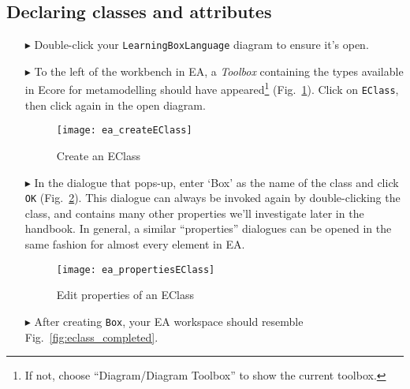 \newpage
\subsection{Declaring classes and attributes}
\visHeader
\hypertarget{static:classes vis}{}

\begin{itemize}

\item[$\blacktriangleright$] Double-click your \texttt{LearningBoxLanguage} diagram to ensure it's open.

\vspace{0.5cm}

\item[$\blacktriangleright$] To the left of the workbench in EA, a \emph{Toolbox} containing the types available in Ecore for metamodelling should have
appeared\footnote{If not, choose ``Diagram/Diagram Toolbox'' to show the current toolbox.} (Fig.~\ref{fig:eclass}). Click on \texttt{EClass}, then click again
in the open diagram.

\vspace{0.5cm}

\begin{figure}[htbp]
	\centering
  \texttt{[image: ea\_createEClass]}
	\caption{Create an EClass}
	\label{fig:eclass}
\end{figure}

\vspace{0.5cm}

\item[$\blacktriangleright$] In the dialogue that pops-up, enter `Box' as the name of the class and click \texttt{OK} (Fig.~\ref{fig:eclass_properties}).
This dialogue can always be invoked again by double-clicking the class, and contains many other properties we'll investigate later in the handbook.
In general, a similar ``properties'' dialogues can be opened in the same fashion for almost every element in EA.

\begin{figure}[ht]
	\centering
  \texttt{[image: ea\_propertiesEClass]}
	\caption{Edit properties of an EClass}
	\label{fig:eclass_properties}
\end{figure}

\newpage

\item[$\blacktriangleright$] After creating \texttt{Box}, your EA workspace should resemble Fig.~\ref{fig:eclass_completed}.


\end{itemize}
